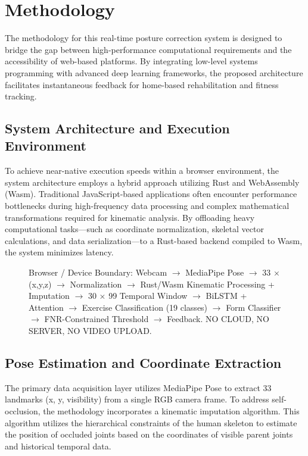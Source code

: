 \documentclass[conference]{IEEEtran}
\begin{document}
\section{Methodology}

The methodology for this real-time posture correction system is designed to bridge the gap between high-performance computational requirements and the accessibility of web-based platforms. By integrating low-level systems programming with advanced deep learning frameworks, the proposed architecture facilitates instantaneous feedback for home-based rehabilitation and fitness tracking.

\subsection{System Architecture and Execution Environment}
To achieve near-native execution speeds within a browser environment, the system architecture employs a hybrid approach utilizing Rust and WebAssembly (Wasm). Traditional JavaScript-based applications often encounter performance bottlenecks during high-frequency data processing and complex mathematical transformations required for kinematic analysis. By offloading heavy computational tasks—such as coordinate normalization, skeletal vector calculations, and data serialization—to a Rust-based backend compiled to Wasm, the system minimizes latency.

\begin{figure}[htbp]
  \centering
  \fbox{\rule{0pt}{2in} \rule{0.8\linewidth}{0pt}} 
  \caption{Browser / Device Boundary: Webcam $\rightarrow$ MediaPipe Pose $\rightarrow$ 33 $\times$ (x,y,z) $\rightarrow$ Normalization $\rightarrow$ Rust/Wasm Kinematic Processing + Imputation $\rightarrow$ 30 $\times$ 99 Temporal Window $\rightarrow$ BiLSTM + Attention $\rightarrow$ Exercise Classification (19 classes) $\rightarrow$ Form Classifier $\rightarrow$ FNR-Constrained Threshold $\rightarrow$ Feedback. NO CLOUD, NO SERVER, NO VIDEO UPLOAD.}
  \label{fig:flowchart}
\end{figure}

\subsection{Pose Estimation and Coordinate Extraction}
The primary data acquisition layer utilizes MediaPipe Pose to extract 33 landmarks (x, y, visibility) from a single RGB camera frame. To address self-occlusion, the methodology incorporates a kinematic imputation algorithm. This algorithm utilizes the hierarchical constraints of the human skeleton to estimate the position of occluded joints based on the coordinates of visible parent joints and historical temporal data.
\end{document}
